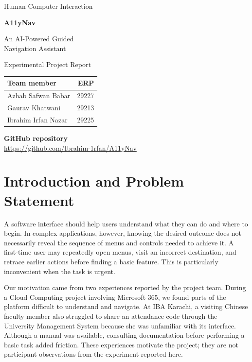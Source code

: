 \documentclass[11pt,a4paper]{article}
\begin{document}
\hypersetup{pageanchor=false}
\begin{titlepage}\centering
\vspace*{28mm}
{\Large Human Computer Interaction\par}
\vspace{16mm}
{\Huge\bfseries A11yNav\par}
\vspace{7mm}
{\LARGE An AI-Powered Guided\\[3mm] Navigation Assistant\par}
\vspace{12mm}
{\large Experimental Project Report\par}
\vspace{23mm}
\begin{tabular}{lr}\toprule
\textbf{Team member} & \textbf{ERP}\\\midrule
Azhab Safwan Babar & 29227\\[3mm]
Gaurav Khatwani & 29213\\[3mm]
Ibrahim Irfan Nazar & 29225\\\bottomrule
\end{tabular}
\vfill
\textbf{GitHub repository}\\[3mm]
\url{https://github.com/Ibrahim-1rfan/A11yNav}
\vspace{14mm}\end{titlepage}
\hypersetup{pageanchor=true}\tableofcontents\clearpage{}
\section{Introduction and Problem Statement}
A software interface should help users understand what they can do and where to begin. In complex applications, however, knowing the desired outcome does not necessarily reveal the sequence of menus and controls needed to achieve it. A first-time user may repeatedly open menus, visit an incorrect destination, and retrace earlier actions before finding a basic feature. This is particularly inconvenient when the task is urgent.

Our motivation came from two experiences reported by the project team. During a Cloud Computing project involving Microsoft 365, we found parts of the platform difficult to understand and navigate. At IBA Karachi, a visiting Chinese faculty member also struggled to share an attendance code through the University Management System because she was unfamiliar with its interface. Although a manual was available, consulting documentation before performing a basic task added friction. These experiences motivate the project; they are not participant observations from the experiment reported here.
\end{document}
